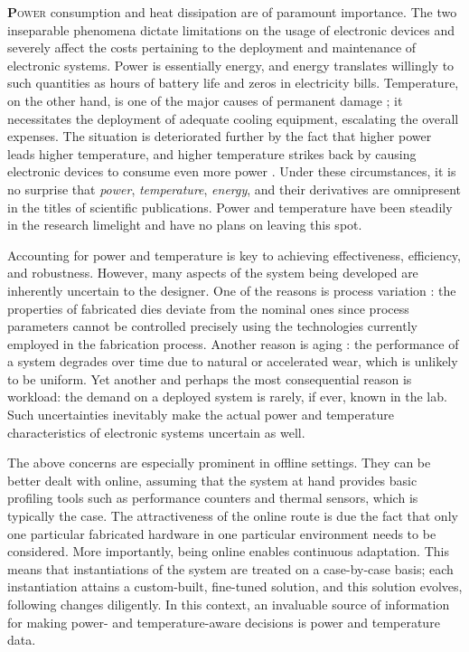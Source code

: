 \lettrine[findent=0.4em, nindent=0em]{\textbf{P}}{ower} consumption and heat
dissipation are of paramount importance. The two inseparable phenomena dictate
limitations on the usage of electronic devices and severely affect the costs
pertaining to the deployment and maintenance of electronic systems. Power is
essentially energy, and energy translates willingly to such quantities as hours
of battery life and zeros in electricity bills. Temperature, on the other hand,
is one of the major causes of permanent damage \cite{jedec}; it necessitates the
deployment of adequate cooling equipment, escalating the overall expenses. The
situation is deteriorated further by the fact that higher power leads higher
temperature, and higher temperature strikes back by causing electronic devices
to consume even more power \cite{liu2007}. Under these circumstances, it is no
surprise that \emph{power}, \emph{temperature}, \emph{energy}, and their
derivatives are omnipresent in the titles of scientific publications. Power and
temperature have been steadily in the research limelight and have no plans on
leaving this spot.

Accounting for power and temperature is key to achieving effectiveness,
efficiency, and robustness. However, many aspects of the system being developed
are inherently uncertain to the designer. One of the reasons is process
variation \cite{chandrakasan2000}: the properties of fabricated dies deviate
from the nominal ones since process parameters cannot be controlled precisely
using the technologies currently employed in the fabrication process. Another
reason is aging \cite{coskun2006}: the performance of a system degrades over
time due to natural or accelerated wear, which is unlikely to be uniform. Yet
another and perhaps the most consequential reason is workload: the demand on a
deployed system is rarely, if ever, known in the lab. Such uncertainties
inevitably make the actual power and temperature characteristics of electronic
systems uncertain as well.

The above concerns are especially prominent in offline settings. They can be
better dealt with online, assuming that the system at hand provides basic
profiling tools such as performance counters and thermal sensors, which is
typically the case. The attractiveness of the online route is due the fact that
only one particular fabricated hardware in one particular environment needs to
be considered. More importantly, being online enables continuous adaptation.
This means that instantiations of the system are treated on a case-by-case
basis; each instantiation attains a custom-built, fine-tuned solution, and this
solution evolves, following changes diligently. In this context, an invaluable
source of information for making power- and temperature-aware decisions is power
and temperature data.

